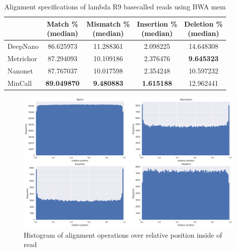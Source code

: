 \documentclass[runningheads,a4paper]{llncs}
\begin{document}
\begin{table}[]
	\caption{Alignment specifications of lambda R9 basecalled reads using BWA mem}
	\label{tbl:lambda_rates_bwa}
	\centering
	\begin{tabular}{lcccc}
		\toprule
		{} &  \thead{Match \% \\(median)} &  \thead{Mismatch \% \\(median)} &  \thead{Insertion \% \\(median)} &  \thead{Deletion \% \\(median)} \\
		\midrule

		DeepNano   &                  86.625973 &                     11.288361 &                       2.098225 &                     14.648308 \\
		Metrichor  &                  87.294093 &                     10.109186 &                       2.376476 &                      \textbf{9.645323 }\\
		Nanonet    &                  87.767037 &                     10.017598 &                       2.354248 &                     10.597232 \\
		MinCall    &                 \textbf{ 89.049870} &                     \textbf{ 9.480883} &                       \textbf{1.615188 }&                     12.962441 \\
		\bottomrule
	\end{tabular}
\end{table}


\begin{figure}[!ht]
	\begin{center}
		\includegraphics[width=1\textwidth]{./imgs/operation_distributed_r9.png}
		\caption{Histogram of alignment operations over relative position inside of read}
		\label{fg:cigar_op_dist}
	\end{center}
\end{figure}
\end{document}
